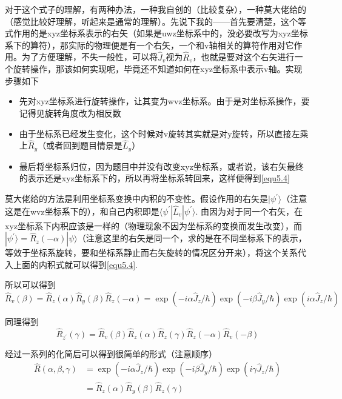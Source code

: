 \documentclass[UTF8]{ctexart}
\begin{document}
    对于这个式子的理解，有两种办法，一种我自创的（比较复杂），一种莫大佬给的（感觉比较好理解，听起来是通常的理解）。先说下我的——首先要清楚，这个等式作用的是xyz坐标系表示的右矢（如果是uwz坐标系中的，没必要改写为xyz坐标系下的算符），那实际的物理便是有一个右矢，一个和v轴相关的算符作用对它作用。为了方便理解，不失一般性，可以将$\hat{J}_v$视为$\hat{R}_v$，也就是要对这个右矢进行一个旋转操作，那该如何实现呢，毕竟还不知道如何在xyz坐标系中表示v轴。实现步骤如下
\begin{itemize}
    \item 先对xyz坐标系进行旋转操作，让其变为wvz坐标系。由于是对坐标系操作，要记得见旋转角度改为相反数
    \item 由于坐标系已经发生变化，这个时候对v旋转其实就是对y旋转，所以直接左乘上$\hat{R}_y$（或者回到题目情景是$\hat{L}_y$）
    \item 最后将坐标系归位，因为题目中并没有改变xyz坐标系，或者说，该右矢最终的表示还是xyz坐标系下的，所以再将坐标系转回来，这样便得到\autoref{equ5.4}
\end{itemize}

\noindent 莫大佬给的方法是利用坐标系变换中内积的不变性。假设作用的右矢是$|\psi^{\prime} \rangle$（注意这是在wvz坐标系下的），和自己内积即是$\langle \psi^{\prime} |\hat{L}_v| \psi^{\prime} \rangle $. 由因为对于同一个右矢，在xyz坐标系下内积应该是一样的（物理现象不因为坐标系的变换而发生改变），而$| \psi^{\prime} \rangle = \hat{R}_z(- \alpha) | \psi \rangle$（注意这里的右矢是同一个，求的是在不同坐标系下的表示，等效于坐标系旋转，要和坐标系静止而右矢旋转的情况区分开来），将这个关系代入上面的内积式就可以得到\autoref{equ5.4}.

    所以可以得到 
    \begin{equation}
        \hat{R}_v(\beta) = \hat{R}_z(\alpha) \hat{R}_y (\beta) \hat{R}_z(-\alpha) = \exp \left(-i\alpha \hat{J}_{z}/\hbar\right) \exp \left(-i\beta \hat{J}_{y}/\hbar\right) \exp \left(i\alpha \hat{J}_{z}/\hbar\right)
    \end{equation}

\noindent 同理得到
\begin{equation}
    \hat{R}_{z^{\prime}}(\gamma) = \hat{R}_v(\beta) \hat{R}_z(\alpha)\hat{R}_z(\gamma) \hat{R}_z(-\alpha)\hat{R}_v(-\beta)
\end{equation}

\noindent 经过一系列的化简后可以得到很简单的形式（注意顺序）
\begin{equation}
    \begin{aligned}
    \hat{R}(\alpha,\beta,\gamma) &= \exp \left(-i\alpha \hat{J}_{z}/\hbar\right) \exp \left(-i\beta \hat{J}_{y}/\hbar\right) \exp \left(i\gamma \hat{J}_{z}/\hbar\right) \\
        &=\hat{R}_z(\alpha) \hat{R}_y(\beta) \hat{R}_z(\gamma)
    \end{aligned}
\end{equation}
\end{document}
